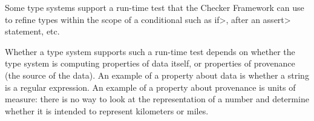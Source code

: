 
Some type systems support a run-time test that the Checker Framework can
use to refine types within the scope of a conditional such as \<if>, after
an \<assert> statement, etc.

Whether a type system supports such a run-time test depends on whether the
type system is computing properties of data itself, or properties of
provenance (the source of the data).  An example of a property about data is
whether a string is a regular expression.  An example of a property about
provenance is units of measure:  there is no way to look at the
representation of a number and determine whether it is intended to
represent kilometers or miles.



